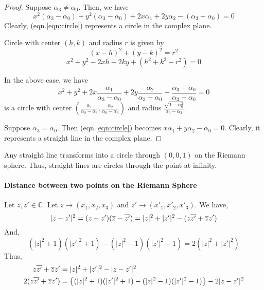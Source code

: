 \begin{proof}
	Suppose $\alpha_3 \ne \alpha_0$.
	Then, we have 
	\begin{equation}
		x^2(\alpha_3-\alpha_0)+y^2(\alpha_3-\alpha_0) + 2x\alpha_1 + 2y\alpha_2 - (\alpha_3+\alpha_0) = 0
		\label{eqn:circle}
	\end{equation}
	Clearly, (eqn.\ref{eqn:circle}) represents a circle in the complex plane.\\

	\begin{commentary}
	\begin{definition}[circle]
		Circle with center $(h,k)$ and radius $r$ is given by
		\[ (x-h)^2+(y-k)^2 = r^2 \]
		\[ x^2+y^2-2xh-2ky+(h^2+k^2-r^2) = 0 \]
	\end{definition}
		\noindent In the above case, we have
		\[ x^2+y^2+2x\frac{\alpha_1}{\alpha_3-\alpha_0}+2y\frac{\alpha_2}{\alpha_3-\alpha_0}-\frac{\alpha_3+\alpha_0}{\alpha_3-\alpha_0} = 0 \]
		is a circle with center $\left(\frac{\alpha_1}{\alpha_0-\alpha_3},\frac{\alpha_2}{\alpha_0-\alpha_3}\right)$ and radius $\frac{\sqrt{1-\alpha_0^2}}{\alpha_0-\alpha_3}$.\\
	\end{commentary}

	Suppose $\alpha_3 = \alpha_0$.
	Then (eqn.\ref{eqn:circle}) becomes $x\alpha_1+ y\alpha_2 - \alpha_0 = 0$.
	Clearly, it represents a straight line in the complex plane.
\end{proof}
\begin{important}
	Any straight line transforms into a circle through $(0,0,1)$ on the Riemann sphere.
	Thus, straight lines are circles through the point at infinity.
\end{important}

\paragraph{Distance between two points on the Riemann Sphere}
Let $z,z' \in \mathbb{C}$.
Let $z \to (x_1,x_2,x_3)$ and $z' \to (x'_1,x'_2,x'_3)$.
We have,
\[ |z-z'|^2 = (z-z')(\overline{z}-\overline{z'})  = |z|^2+|{z'}|^2 - (z\overline{z'}+\overline{z}z') \]
And,
\[ (|z|^2+1)(|{z'}|^2+1)-(|z|^2-1)(|{z'}|^2-1) = 2(|z|^2+|{z'}|^2)  \]
Thus,
\begin{align*}
	z\overline{z'}+\overline{z}z'  
	& = |z|^2+|{z'}|^2 - |z-z'|^2 \\
	2(z\overline{z'}+\overline{z}z')  
	& = \left\{ (|z|^2+1)(|{z'}|^2+1) - (|z|^2-1)(|{z'}|^2-1)\right\} - 2|z-{z'}|^2
\end{align*}

